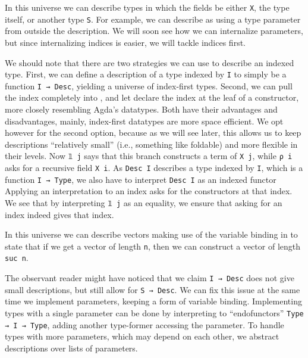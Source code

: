 In this universe we can describe types in which the fields be either \texttt{X}, the type itself, or another type \texttt{S}. For example, we can describe  as
using a type parameter from outside the description. We will soon see how we can internalize parameters, but since internalizing indices is easier, we will tackle indices first.

We should note that there are two strategies we can use to describe an indexed type. First, we can define a description of a type indexed by \texttt{I} to simply be a function \texttt{I → Desc}, yielding a universe of index-first types. Second, we can pull the index completely into , and let  declare the index at the leaf of a constructor, more closely resembling Agda's datatypes. Both have their advantages and disadvantages, mainly, index-first datatypes are more space efficient. We opt however for the second option, because as we will see later, this allows us to keep descriptions ``relatively small'' (i.e., something like foldable) and more flexible in their levels.
Now \texttt{𝟙 j} says that this branch constructs a term of \texttt{X j}, while \texttt{ρ i} asks for a recursive field \texttt{X i}. As \texttt{Desc I} describes a type indexed by \texttt{I}, which is a function \texttt{I → Type}, we also have to interpret \texttt{Desc I} as an indexed functor 
Applying an interpretation to an index asks for the constructors at that index. We see that by interpreting \texttt{𝟙 j} as an equality, we ensure that asking for an index indeed gives that index.

In this universe we can describe vectors
making use of the variable binding in  to state that if we get a vector of length \texttt{n}, then we can construct a vector of length \texttt{suc n}.

The observant reader might have noticed that we claim \texttt{I → Desc} does not give small descriptions, but still allow for \texttt{S → Desc}. We can fix this issue at the same time we implement parameters, keeping a form of variable binding. Implementing types with a single parameter can be done by interpreting to ``endofunctors'' \texttt{Type → I → Type}, adding another type-former accessing the parameter. To handle types with more parameters, which may depend on each other, we abstract descriptions over lists of parameters.

